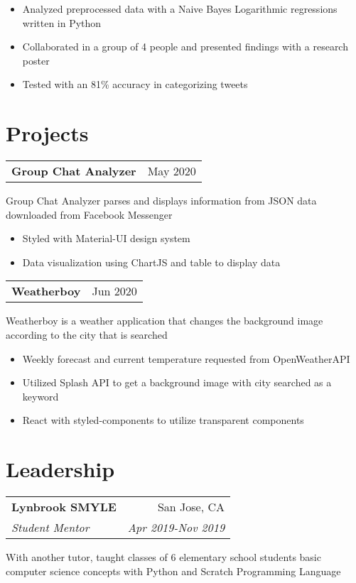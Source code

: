 \documentclass[letterpaper,8pt]{article}
\makeatletter
\newcommand{\resumeSubheading}[4]{
  \vspace{0.25em}
  \begin{tabular*}{0.97\textwidth}[t]{l@{\extracolsep{\fill}}r}
    \textbf{#1} & #2 \\
    \textit{#3} & \textit{#4} \\
  \end{tabular*}\vspace{0.25em}
}
\newcommand{\resumeSubheadingTwo}[2]{
  \vspace{0.25em}
  \begin{tabular*}{0.97\textwidth}[t]{l@{\extracolsep{\fill}}r}
    \textbf{#1} & #2 \\
  \end{tabular*}\vspace{0.25em}
}
\makeatother
\begin{document}
\begin{itemize}[label=\raisebox{0.25ex}{\tiny$\bullet$}]
  \item Analyzed preprocessed data with a Naive Bayes Logarithmic regressions written in Python
  \item Collaborated in a group of 4 people and presented findings with a research poster
  \item Tested with an 81\% accuracy in categorizing tweets
\end{itemize}

\section{Projects}

\resumeSubheadingTwo{Group Chat Analyzer}{May 2020}

Group Chat Analyzer parses and displays information from JSON data downloaded from Facebook Messenger

\begin{itemize}[label=\raisebox{0.25ex}{\tiny$\bullet$}]
  \item Styled with Material-UI design system
  \item Data visualization using ChartJS and table to display data
\end{itemize}

\resumeSubheadingTwo{Weatherboy}
{Jun 2020}

Weatherboy is a weather application that changes the background image according to the city that is searched

\begin{itemize}[label=\raisebox{0.25ex}{\tiny$\bullet$}]
  \item Weekly forecast and current temperature requested from OpenWeatherAPI
  \item Utilized Splash API to get a background image with city searched as a keyword
  \item React with styled-components to utilize transparent components
\end{itemize}


\section{Leadership}

\resumeSubheading{Lynbrook SMYLE}
{San Jose, CA}{Student Mentor}{Apr 2019-Nov 2019}

With another tutor, taught classes of 6 elementary school students basic computer science concepts with Python and Scratch Programming Language
\end{document}
